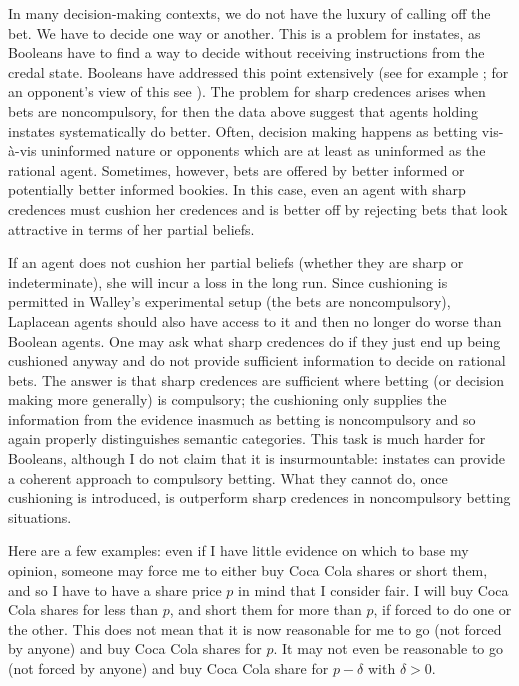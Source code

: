 \documentclass[11pt]{article}
\begin{document}
In many decision-making contexts, we do not have the luxury of calling
off the bet. We have to decide one way or another. This is a problem
for instates, as Booleans have to find a way to decide without
receiving instructions from the credal state. Booleans have addressed
this point extensively (see for example ; for
an opponent's view of this see ). The problem
for sharp credences arises when bets are noncompulsory, for then the
data above suggest that agents holding instates systematically do
better. Often, decision making happens as betting vis-{\`a}-vis
uninformed nature or opponents which are at least as uninformed as the
rational agent. Sometimes, however, bets are offered by better
informed or potentially better informed bookies. In this case, even an
agent with sharp credences must cushion her credences and is better
off by rejecting bets that look attractive in terms of her partial
beliefs.

If an agent does not cushion her partial beliefs (whether they are
sharp or indeterminate), she will incur a loss in the long run. Since
cushioning is permitted in Walley's experimental setup (the bets are
noncompulsory), Laplacean agents should also have access to it and
then no longer do worse than Boolean agents. One may ask what sharp
credences do if they just end up being cushioned anyway and do not
provide sufficient information to decide on rational bets. The answer
is that sharp credences are sufficient where betting (or decision
making more generally) is compulsory; the cushioning only supplies the
information from the evidence inasmuch as betting is noncompulsory and
so again properly distinguishes semantic categories. This task is much
harder for Booleans, although I do not claim that it is
insurmountable: instates can provide a coherent approach to compulsory
betting. What they cannot do, once cushioning is introduced, is
outperform sharp credences in noncompulsory betting situations.

Here are a few examples: even if I have little evidence on which to
base my opinion, someone may force me to either buy Coca Cola shares
or short them, and so I have to have a share price $p$ in mind that I
consider fair. I will buy Coca Cola shares for less than $p$, and
short them for more than $p$, if forced to do one or the other. This
does not mean that it is now reasonable for me to go (not forced by
anyone) and buy Coca Cola shares for $p$. It may not even be
reasonable to go (not forced by anyone) and buy Coca Cola share for
$p-\delta$ with $\delta{}>0$.
\end{document}
